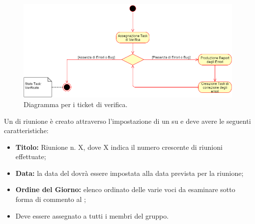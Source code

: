 \documentclass[12pt,a4paper]{article}
\begin{document}
\begin{center}
	\begin{figure}[H]
		\centering
		\label{f1-TicketVerifica}
		\includegraphics[scale=0.6]{TicketVerifica.png}
		\caption{Diagramma per i ticket di verifica.}
	\end{figure}
\end{center}
\label{ticketRiunione}
Un  di riunione è creato attraverso l'impostazione di un  su \textit{} e deve avere le seguenti caratteristiche:
\begin{itemize}
	\item \textbf{Titolo:} Riunione n. X, dove X indica il numero crescente di riunioni effettuate;
	\item \textbf{Data:} la data del  dovrà essere impostata alla data prevista per la riunione;
	\item \textbf{Ordine del Giorno:} elenco ordinato delle varie voci da esaminare sotto forma di commento al \textit{};
	\item Deve essere assegnato a tutti i membri del gruppo.
\end{itemize}


\newpage
\printglossary[title={Glossario}]
\end{document}
